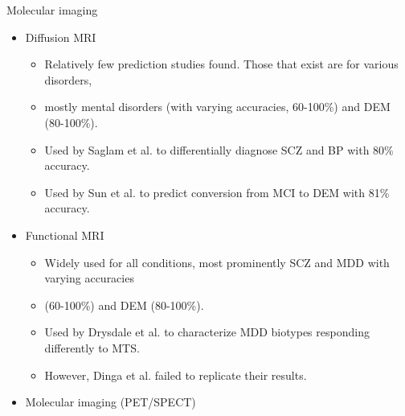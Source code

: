 \documentclass[10pt]{beamer}
\def\summaryouteritems{-0.4em}
\def\summaryinneritems{-0.3em}
\def\summaryinnertop{-0.5em}
\begin{document}
\begin{frame}[t]{Molecular imaging}
{\begin{itemize}[itemsep=\summaryouteritems]
                \item[\textcolor{gray!50}{\textbullet}] {\footnotesize \textcolor{gray!50}{Diffusion MRI}}
                \begin{itemize}[itemsep=\summaryinneritems]
                    \vspace{\summaryinnertop}
                    \item[\textcolor{gray!50}{\textbullet}] {\scriptsize \textcolor{gray!50}{Relatively few prediction studies found. Those that exist are for various disorders,}}
                    \item[] {\scriptsize \textcolor{gray!50}{mostly mental disorders (with varying accuracies, 60-100\%) and DEM (80-100\%).}}
                    \item[\textcolor{gray!50}{\textbullet}] {\scriptsize \textcolor{gray!50}{Used by Saglam et al. to differentially diagnose SCZ and BP with 80\% accuracy.}}
                    \item[\textcolor{gray!50}{\textbullet}] {\scriptsize \textcolor{gray!50}{Used by Sun et al. to predict conversion from MCI to DEM with 81\% accuracy.}}
                \end{itemize}
                \item[\textcolor{gray!50}{\textbullet}] \textcolor{gray!50}{\footnotesize{Functional MRI}}
                \begin{itemize}[itemsep=\summaryinneritems]
                    \vspace{\summaryinnertop}
                    \item[\textcolor{gray!50}{\textbullet}] {\scriptsize \textcolor{gray!50}{Widely used for all conditions, most prominently SCZ and MDD with varying accuracies}}
                    \item[] {\scriptsize \textcolor{gray!50}{(60-100\%) and DEM (80-100\%).}}
                    \item[\textcolor{gray!50}{\textbullet}] {\scriptsize \textcolor{gray!50}{Used by Drysdale et al. to characterize MDD biotypes responding differently to MTS.}}
                    \item[\textcolor{gray!50}{\textbullet}] {\scriptsize \textcolor{gray!50}{However, Dinga et al. failed to replicate their results.}}
                \end{itemize}
                \item[\textbullet] {\footnotesize Molecular imaging (PET/SPECT)}
                \begin{itemize}[itemsep=\summaryinneritems]

\end{itemize}
\end{itemize}}
\end{frame}
\end{document}
